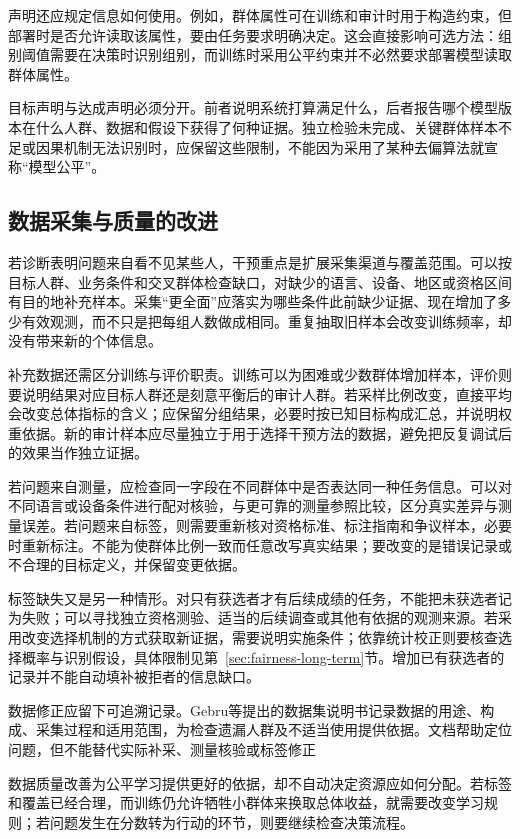 声明还应规定信息如何使用。例如，群体属性可在训练和审计时用于构造约束，但部署时是否允许读取该属性，要由任务要求明确决定。这会直接影响可选方法：组别阈值需要在决策时识别组别，而训练时采用公平约束并不必然要求部署模型读取群体属性。

目标声明与达成声明必须分开。前者说明系统打算满足什么，后者报告哪个模型版本在什么人群、数据和假设下获得了何种证据。独立检验未完成、关键群体样本不足或因果机制无法识别时，应保留这些限制，不能因为采用了某种去偏算法就宣称“模型公平”。

\subsection{数据采集与质量的改进}
\label{sec:fairness-data-intervention}

若诊断表明问题来自看不见某些人，干预重点是扩展采集渠道与覆盖范围。可以按目标人群、业务条件和交叉群体检查缺口，对缺少的语言、设备、地区或资格区间有目的地补充样本。采集“更全面”应落实为哪些条件此前缺少证据、现在增加了多少有效观测，而不只是把每组人数做成相同。重复抽取旧样本会改变训练频率，却没有带来新的个体信息。

补充数据还需区分训练与评价职责。训练可以为困难或少数群体增加样本，评价则要说明结果对应目标人群还是刻意平衡后的审计人群。若采样比例改变，直接平均会改变总体指标的含义；应保留分组结果，必要时按已知目标构成汇总，并说明权重依据。新的审计样本应尽量独立于用于选择干预方法的数据，避免把反复调试后的效果当作独立证据。

若问题来自测量，应检查同一字段在不同群体中是否表达同一种任务信息。可以对不同语言或设备条件进行配对核验，与更可靠的测量参照比较，区分真实差异与测量误差。若问题来自标签，则需要重新核对资格标准、标注指南和争议样本，必要时重新标注。不能为使群体比例一致而任意改写真实结果；要改变的是错误记录或不合理的目标定义，并保留变更依据。

标签缺失又是另一种情形。对只有获选者才有后续成绩的任务，不能把未获选者记为失败；可以寻找独立资格测验、适当的后续调查或其他有依据的观测来源。若采用改变选择机制的方式获取新证据，需要说明实施条件；依靠统计校正则要核查选择概率与识别假设，具体限制见第~\ref{sec:fairness-long-term}节。增加已有获选者的记录并不能自动填补被拒者的信息缺口。

数据修正应留下可追溯记录。Gebru等提出的数据集说明书记录数据的用途、构成、采集过程和适用范围，为检查遗漏人群及不适当使用提供依据。文档帮助定位问题，但不能替代实际补采、测量核验或标签修正

数据质量改善为公平学习提供更好的依据，却不自动决定资源应如何分配。若标签和覆盖已经合理，而训练仍允许牺牲小群体来换取总体收益，就需要改变学习规则；若问题发生在分数转为行动的环节，则要继续检查决策流程。

